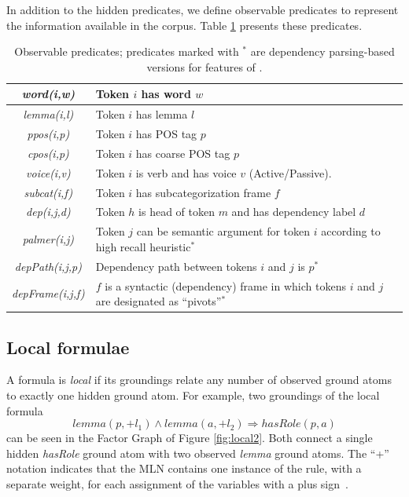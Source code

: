 In addition to the hidden predicates, we define observable predicates to
represent the information available in the corpus. Table \ref{tbl:o_preds}
presents these predicates. 
\begin{table}
    \small
    \centering
    \begin{tabular}{|c|p{4.5cm}|}
        \hline
    \emph{word(i,w)}    & Token $i$ has word $w$\\\hline
    \emph{lemma(i,l)}   & Token $i$ has lemma $l$\\\hline
    \emph{ppos(i,p)}    & Token $i$ has POS tag $p$\\\hline
    \emph{cpos(i,p)}    & Token $i$ has coarse POS tag $p$\\\hline
    \emph{voice(i,v)}   & Token $i$ is verb and has voice $v$ (Active/Passive).\\\hline
    \emph{subcat(i,f)} & Token $i$ has subcategorization frame $f$\\\hline\hline
    \emph{dep(i,j,d)}     & Token $h$ is head of token $m$ and has dependency label $d$\\\hline
    \emph{palmer(i,j)}  & Token $j$ can be semantic argument for token $i$ according to high recall heuristic$^*$\\\hline
    \emph{depPath(i,j,p)}      & Dependency path between tokens $i$ and $j$ is $p$$^*$\\\hline
    \emph{depFrame(i,j,f)}     & $f$ is a syntactic (dependency) frame in which tokens $i$ and $j$ are designated as ``pivots''$^*$\\\hline
    \end{tabular}
    \caption{Observable predicates; predicates marked with $^*$ are dependency parsing-based versions for features of \citet{xue04calibrating}.}
    \label{tbl:o_preds}
\end{table}


\subsection{Local formulae}
\label{sec:local}

A formula is \emph{local} if its groundings relate any number of observed ground atoms to exactly one hidden ground atom. For example, two groundings of the local formula 
\[lemma(p,+l_1) \wedge lemma(a,+l_2) \Rightarrow hasRole(p,a)\]
can be seen in the Factor Graph of Figure \ref{fig:local2}. Both connect a single  hidden \emph{hasRole} ground atom with two observed \emph{lemma} ground atoms. The “+” notation indicates that the MLN contains one instance of the rule, with a separate weight, 
for each assignment of the variables with a 
plus sign~\citep{poon08joint}.

